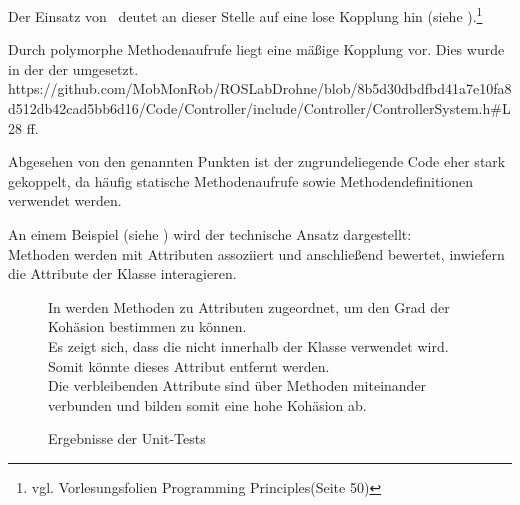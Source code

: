 
Der Einsatz von \ROS\ deutet an dieser Stelle auf eine lose Kopplung hin (siehe ).\footnote{vgl. Vorlesungsfolien \glq Programming Principles\grq (Seite 50)} 

Durch polymorphe Methodenaufrufe liegt eine mäßige Kopplung vor. Dies wurde in der  der  umgesetzt.\\
https://github.com/MobMonRob/ROSLabDrohne/blob/8b5d30dbdfbd41a7e10fa8d512db42cad5bb6d16/Code/Controller/include/Controller/ControllerSystem.h\#L28 ff.


Abgesehen von den genannten Punkten ist der zugrundeliegende Code eher stark gekoppelt, da häufig statische Methodenaufrufe sowie Methodendefinitionen verwendet werden.


An einem Beispiel (siehe ) wird der technische Ansatz dargestellt:\\
Methoden werden mit Attributen assoziiert und anschließend bewertet, inwiefern die Attribute der Klasse interagieren.

\begin{figure}[ht!]
\vspace{0.25cm}
\begin{center}
\caption{Ergebnisse der Unit-Tests}
\label{fig:Cohe}
\end{center}

\vspace{0.25cm}
In  werden Methoden zu Attributen zugeordnet, um den Grad der Kohäsion bestimmen zu können.\\
Es zeigt sich, dass die  nicht innerhalb der Klasse verwendet wird. Somit könnte dieses Attribut entfernt werden.\\
Die verbleibenden Attribute sind über Methoden miteinander verbunden und bilden somit eine hohe Kohäsion ab.
\end{figure}










